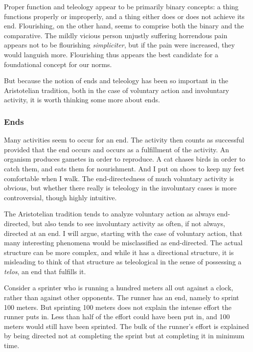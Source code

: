 Proper function and teleology appear to be primarily binary concepts: a thing functions properly or improperly, and a thing either 
does or does not achieve its end. Flourishing, on the other hand, seems to comprise both the binary and the comparative. The mildly
vicious person unjustly suffering horrendous pain appears not to be flourishing \textit{simpliciter}, but if the pain were increased,
they would languish more. Flourishing thus appears the best candidate for a foundational concept for our norms.

But because the notion of ends and teleology has been so important in the Aristotelian tradition, both in the case of voluntary 
action and involuntary activity, it is worth thinking some more about ends.

\subsubsection{Ends}
Many activities seem to occur for an end. The activity then counts as successful provided that the end occurs and occurs as a
fulfillment of the activity. An organism produces gametes in order to reproduce. A cat chases birds in order to catch them,
and eats them for nourishment. And I put on shoes to keep my feet comfortable when I walk. The end-directedness of much voluntary
activity is obvious, but whether there really is teleology in the involuntary cases is more controversial, though highly intuitive.

The Aristotelian tradition tends to analyze voluntary action as always end-directed, but also tends to see involuntary activity as 
often, if not always, directed at an end. I will argue, starting with the case of voluntary action, that many interesting phenomena 
would be misclassified as end-directed. The actual structure can be more complex, and while it has a directional structure, it is
misleading to think of that structure as teleological in the sense of possessing a \textit{telos}, an end that fulfills it.

Consider a sprinter who is running a hundred meters all out against a clock, rather than against other opponents. The runner has an end, 
namely to sprint 100 meters. But sprinting 100 meters does not explain the intense effort the runner puts in. Less than half of the effort 
could have been put in, and 100 meters would still have been sprinted. The bulk of the runner's effort is explained by being directed 
not at completing the sprint but at completing it in minimum time.

